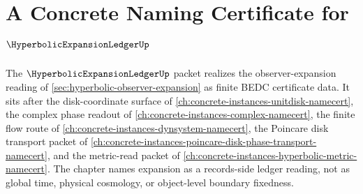 \chapter{A Concrete Naming Certificate for $\HyperbolicExpansionLedgerUp$}
\label{ch:concrete-instances-hyperbolic-expansion-ledger-namecert}

The $\HyperbolicExpansionLedgerUp$ packet realizes the observer-expansion reading of \autoref{sec:hyperbolic-observer-expansion} as finite BEDC certificate data. It sits after the disk-coordinate surface of \autoref{ch:concrete-instances-unitdisk-namecert}, the complex phase readout of \autoref{ch:concrete-instances-complex-namecert}, the finite flow route of \autoref{ch:concrete-instances-dynsystem-namecert}, the Poincare disk transport packet of \autoref{ch:concrete-instances-poincare-disk-phase-transport-namecert}, and the metric-read packet of \autoref{ch:concrete-instances-hyperbolic-metric-namecert}. The chapter names expansion as a records-side ledger reading, not as global time, physical cosmology, or object-level boundary fixedness.

